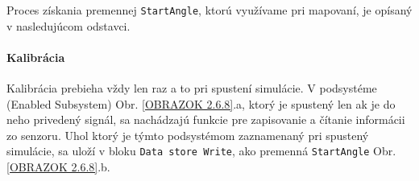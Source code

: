 Proces získania premennej \verb|StartAngle|, ktorú využívame pri mapovaní, je opísaný v nasledujúcom odstavci. 

\paragraph{Kalibrácia} 
Kalibrácia prebieha vždy len raz a to pri spustení simulácie. V podsystéme (Enabled Subsystem) Obr. \ref{OBRAZOK 2.6.8}.a, ktorý je spustený len ak je do neho privedený signál, sa nachádzajú funkcie pre zapisovanie a čítanie informácii zo senzoru. Uhol ktorý je týmto podsystémom zaznamenaný pri spustený simulácie, sa uloží v bloku \verb|Data store Write|, ako premenná \verb|StartAngle| Obr. \ref{OBRAZOK 2.6.8}.b.                                                                                                                                                                                                                                                                                                                                                                                                                                                                                                                                                                                                                                                                                                                                                                                                                                                                                                                                                                                                                                                                                                                                                                                                                                                                                                                                                                                                                                                                                                                                                                                                                                                                                                                                                                                                                                                                                                                                                                                                                                                                                                                                                                                                                                                                                                                                                                                                                                                                                                                                                                                                                                                           